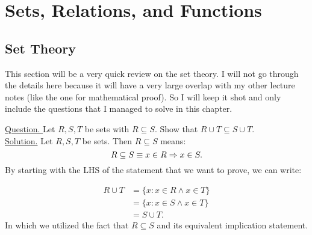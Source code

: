 

\section{Sets, Relations, and Functions}

\subsection{Set Theory}

This section will be a very quick review on the set theory. I will not go through the details here because it will have a very large overlap with my other lecture notes (like the one for mathematical proof). So I will keep it shot and only include the questions that I managed to solve in this chapter.


\begin{example}{ }
	\underline{Question. }Let $ R,S,T $ be sets with $ R \subseteq S $. Show that $ R \cup T \subseteq S \cup T $.\\
	
	\underline{Solution.} Let $ R,S,T $ be sets. Then $ R \subseteq S $ means:
	\[ R \subseteq S \equiv x \in R \Rightarrow x \in S. \]
	By starting with the LHS of the statement that we want to prove, we can write:

	\begin{align*}
		R \cup T &= \{ x: x \in R \wedge x \in T \} \\
		&= \{x: x \in S \wedge x \in T \}  \\
		&= S \cup T.
	\end{align*}
	In which we utilized the fact that $ R \subseteq S $ and its equivalent implication statement. 


\end{example}

